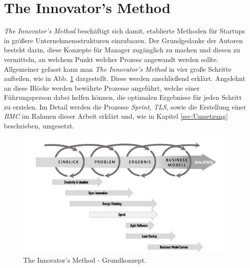 \section{The Innovator's Method}
\label{sec:TheInnovatorsMethod}
\textit{The Innovator's Method} beschäftigt sich damit, etablierte Methoden für Startups in größere Unternehmensstrukturen einzubauen. Der Grundgedanke der Autoren \citeauthor{TheInnovatorsMethod} besteht darin, diese Konzepte für Manager zugänglich zu machen und diesen zu vermitteln, an welchem Punkt welcher Prozess angewandt werden sollte. Allgemeiner gefasst kann man \textit{The Innovator's Method} in vier große Schritte aufteilen, wie in Abb. \ref{fig:TheInnovatorsMethod} dargestellt. Diese werden anschließend erklärt. Angelehnt an diese Blöcke werden bewährte Prozesse angeführt, welche einer Führungsperson dabei helfen können, die optimalen Ergebnisse für jeden Schritt zu erzielen.
Im Detail werden die Prozesse \textit{Sprint}, \textit{\ac{TLS}}, sowie die Erstellung einer \textit{\ac{BMC}} im Rahmen dieser Arbeit erklärt und, wie in Kapitel \ref{sec:Umsetzung} beschrieben, umgesetzt.

\begin{figure}[h!]
	\begin{center}
		\includegraphics[width=\textwidth]{99_IMG/02_Grundlagen/innovatorsMethod.jpg}
		\caption{The Innovator's Method - Grundkonzept.}
		\label{fig:TheInnovatorsMethod}
	\end{center}
\end{figure}

